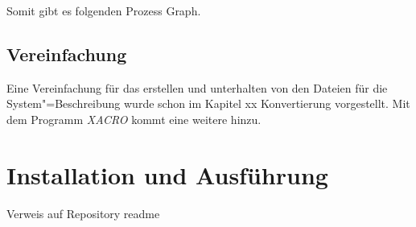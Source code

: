 Somit gibt es folgenden Prozess Graph.



\subsection{Vereinfachung}
Eine Vereinfachung für das erstellen und unterhalten von den Dateien für die System"=Beschreibung wurde schon im Kapitel xx Konvertierung vorgestellt. %
Mit dem Programm \textit{XACRO} kommt eine weitere hinzu. 



\section{Installation und Ausführung}
Verweis auf Repository readme